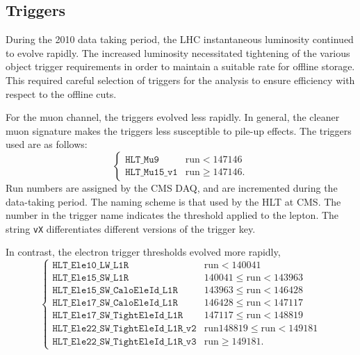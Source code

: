 

\subsection{Triggers}
\label{sec:wpol_triggers}
During the 2010 data taking period, the \ac{LHC} instantaneous luminosity
continued to evolve rapidly. The increased luminosity necessitated tightening of
the various object trigger requirements in order to maintain a suitable rate for
offline storage. This required careful selection of triggers for the analysis to
ensure efficiency with respect to the offline cuts.

For the muon channel, the triggers evolved less rapidly. In general, the cleaner
muon signature makes the triggers less susceptible to pile-up effects. The
triggers used are as follows:
\begin{equation*}
\begin{cases}
\texttt{HLT\_Mu9}          & \textrm{run} < 147146 \\
\texttt{HLT\_Mu15\_v1} & \textrm{run} \geq 147146.
\end{cases}
\end{equation*}
Run numbers are assigned by the \ac{CMS} \ac{DAQ}, and are incremented during
the data-taking period. The naming scheme is that used by the \ac{HLT} at
\ac{CMS}. The number in the trigger name indicates the \Pt threshold applied to
the lepton. The string \texttt{vX} differentiates different versions of the
trigger key.

In contrast, the electron trigger thresholds evolved more rapidly,
\begin{equation*}
\begin{cases}
  \texttt{HLT\_Ele10\_LW\_L1R} & \textrm{run} < 140041 \\
  \texttt{HLT\_Ele15\_SW\_L1R} & 140041 \leq \textrm{run} < 143963 \\
  \texttt{HLT\_Ele15\_SW\_CaloEleId\_L1R} & 143963 \leq \textrm{run} < 146428 \\
  \texttt{HLT\_Ele17\_SW\_CaloEleId\_L1R} & 146428 \leq \textrm{run} < 147117 \\
  \texttt{HLT\_Ele17\_SW\_TightEleId\_L1R} & 147117 \leq \textrm{run} < 148819 \\
  \texttt{HLT\_Ele22\_SW\_TightEleId\_L1R\_v2} & \textrm{run} 148819 \leq \textrm{run} < 149181 \\
  \texttt{HLT\_Ele22\_SW\_TightEleId\_L1R\_v3} & \textrm{run} \geq 149181.
\end{cases}
\end{equation*}

